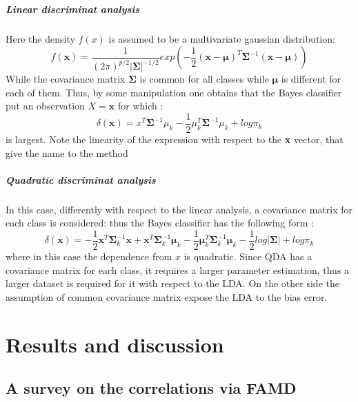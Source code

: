 \documentclass[
12pt, %
a4paper, %
oneside, %
headinclude,footinclude, %
BCOR5mm, %
]{scrartcl}
\begin{document}
\subparagraph{Linear discriminat analysis}
Here the density $f(x)$ is assumed to be a multivariate gaussian distribution\cite{james2013introduction}: 
\begin{equation}
f(\textbf{x})=\dfrac{1}{\left(2 \pi\right)^{p/2}\lvert \boldsymbol {\Sigma}\rvert^{-1/2} }exp \left(-\frac{1}{2}\left(\textbf{x}-\boldsymbol{\mu}\right)^{T}\boldsymbol {\Sigma}^{-1}\left(\textbf{x}-\boldsymbol{\mu}\right)\right)
\end{equation}
While the covariance matrix $\boldsymbol {\Sigma}$ is common for all classes while $\boldsymbol{\mu}$ is different for each of them. Thus, by some manipulation one obtains that the Bayes classifier put an observation $X=\textbf{x}$ for which \cite{james2013introduction}:
\begin{equation}
\delta(\textbf{x})=x^{T} \boldsymbol {\Sigma}^{-1} \mu_{k}-\frac{1}{2}\mu^{T}_{k}\boldsymbol {\Sigma}^{-1}\mu_{k}+log\pi_{k}
\end{equation}
is largest. Note the linearity of the expression with respect to the \textbf{x} vector, that give the name to the method 
\subparagraph{Quadratic discriminat analysis}
In this case, differently with respect to the linear analysis, a covariance matrix for each class is considered: thus the Bayes classifier has the following form \cite{james2013introduction}:  
\begin{equation}
\delta(\textbf{x})=-\dfrac{1}{2}\textbf{x}^{T}\boldsymbol {\Sigma}^{-1}_{k}\textbf{x}+\textbf{x}^{T}\boldsymbol {\Sigma}^{-1}_{k}\boldsymbol{\mu}_{k}-\dfrac{1}{2}\boldsymbol{\mu}_{k}^{T}\boldsymbol {\Sigma}^{-1}_{k}\boldsymbol{\mu}_{k}-\dfrac{1}{2}log\lvert \boldsymbol {\Sigma}\rvert+log\pi_{k}
\end{equation}
where in this case the dependence from $x$ is quadratic. Since QDA has a covariance matrix for each class, it requires a larger parameter estimation, thus a larger dataset is required for it with respect to the LDA. On the other side the assumption of common covariance matrix expose the LDA to the bias error.



\section{Results and discussion}


\subsection{A survey on the correlations via FAMD}
\end{document}

